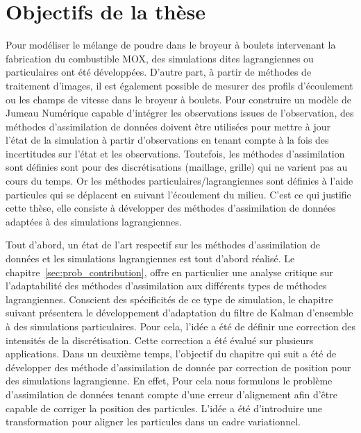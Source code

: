 

\section{Objectifs de la thèse}

Pour modéliser le mélange de poudre dans le broyeur à boulets intervenant la fabrication du combustible MOX, des simulations dites lagrangiennes ou particulaires ont été développées. D'autre part, à partir de méthodes de traitement d'images, il est également possible de mesurer des profils d'écoulement ou les champs de vitesse dans le broyeur à boulets. Pour construire un modèle de Jumeau Numérique capable d’intégrer les observations issues de l’observation, des méthodes d'assimilation de données doivent être utilisées pour mettre à jour l'état de la simulation à partir d'observations en tenant compte à la fois des incertitudes sur l’état et les observations. Toutefois, les méthodes d'assimilation sont définies sont pour des discrétisations (maillage, grille) qui ne varient pas au cours du temps. Or les méthodes particulaires/lagrangiennes sont définies à l’aide particules qui se déplacent en suivant l’écoulement du milieu.
C'est ce qui justifie cette thèse, elle consiste à développer des méthodes d'assimilation de données adaptées à des simulations lagrangiennes.

Tout d'abord, un état de l'art respectif sur les méthodes d'assimilation de données et les simulations lagrangiennes est tout d'abord réalisé. Le chapitre~\ref{sec:prob_contribution}, offre en particulier une analyse critique sur l'adaptabilité des méthodes d'assimilation aux différents types de méthodes lagrangiennes.
Conscient des spécificités de ce type de simulation, le chapitre suivant présentera le développement d'adaptation du filtre de Kalman d'ensemble à des simulations particulaires. Pour cela, l'idée a été de définir une correction des intensités de la discrétisation. Cette correction a été évalué sur plusieurs applications.
Dans un deuxième temps, l'objectif du chapitre qui suit a été de développer des méthode d'assimilation de donnée par correction de position pour des simulations lagrangienne. En effet, Pour cela nous formulons le problème d'assimilation de données tenant compte d'une erreur d'alignement afin d'être capable de corriger la position des particules. L'idée a été d'introduire une transformation pour aligner les particules dans un cadre variationnel.
